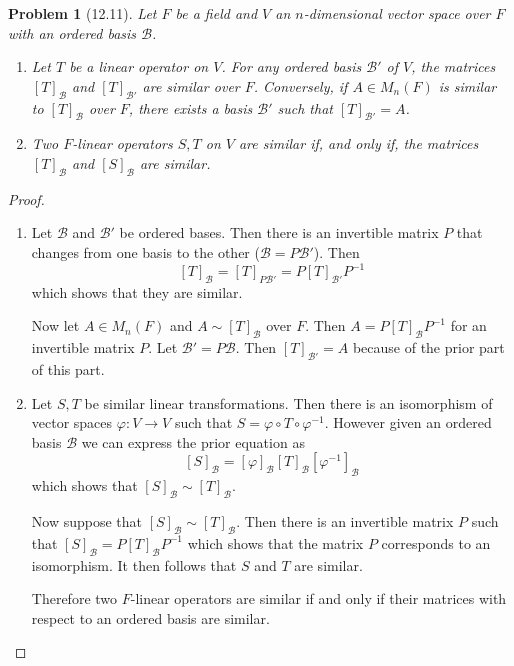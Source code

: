\documentclass[10pt]{article}
\newcommand{\sk}{\vskip 10mm}
\theoremstyle{plain}
\newtheorem{problem}{Problem}
\theoremstyle{remark}
\begin{document}
\sk

\begin{problem}[12.11]
  Let $F$ be a field and $V$ an $n$-dimensional vector space
  over $F$ with an ordered basis $\mathcal{B}$.
  \begin{enumerate}
  \item Let $T$ be a linear operator on $V$. For any ordered basis
    $\mathcal{B}'$ of $V$, the matrices $[T]_{\mathcal{B}}$ and
    $[T]_{\mathcal{B}'}$ are similar over $F$. Conversely, if
    $A\in M_n(F)$ is similar to $[T]_{\mathcal{B}}$ over $F$, there
    exists a basis $\mathcal{B}'$ such that $[T]_{\mathcal{B}'}=A$.
  \item Two $F$-linear operators $S,T$ on $V$ are similar if, and only if,
    the matrices $[T]_{\mathcal{B}}$ and $[S]_{\mathcal{B}}$ are similar.
  \end{enumerate}
\end{problem}

\begin{proof}
  \begin{enumerate}
  \item Let $\mathcal{B}$ and $\mathcal{B}'$ be ordered bases. Then there is
    an invertible matrix $P$ that changes from one basis to the other
    ($\mathcal{B}=P\mathcal{B}'$).
    Then
    \[[T]_{\mathcal{B}}=[T]_{P\mathcal{B}'}=P[T]_{\mathcal{B}'}P^{-1} \]
    which shows that they are similar.

    Now let $A\in M_n(F)$ and $A\sim [T]_{\mathcal{B}}$ over $F$. Then
    $A=P[T]_{\mathcal{B}}P^{-1}$ for an invertible matrix $P$. Let
    $\mathcal{B}'=P\mathcal{B}$. Then $[T]_{\mathcal{B}'}=A$ because of the prior
    part of this part.
  \item Let $S,T$ be similar linear transformations. Then there is an isomorphism
    of vector spaces $\varphi:V\rightarrow V$ such that $S=\varphi\circ T\circ\varphi^{-1}$. However given an ordered
    basis $\mathcal{B}$ we can express the prior equation as
    \[ [S]_{\mathcal{B}}=[\varphi]_{\mathcal{B}}[T]_{\mathcal{B}}[\varphi^{-1}]_{\mathcal{B}}\]
    which shows that $[S]_{\mathcal{B}}\sim[T]_{\mathcal{B}}$.

    Now suppose that $[S]_{\mathcal{B}}\sim[T]_{\mathcal{B}}$. Then there is an invertible
    matrix $P$ such that $[S]_{\mathcal{B}}=P[T]_{\mathcal{B}}P^{-1}$ which shows that
    the matrix $P$ corresponds to an isomorphism. It then follows that
    $S$ and $T$ are similar.

    Therefore two $F$-linear operators are similar if and only if their matrices
    with respect to an ordered basis are similar.
  \end{enumerate}
\end{proof}
\end{document}
